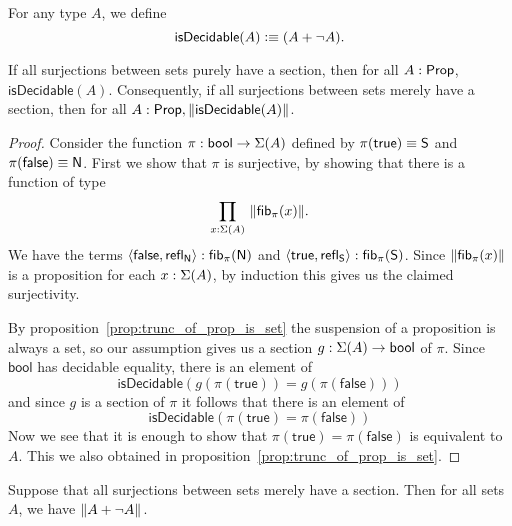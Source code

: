 \begin{defn}
For any  type  $A$, we define
\begin{equation*}
\mathsf{isDecidable}(A)\vcentcolon\equiv  (A+\neg A).
\end{equation*}
\end{defn}

\begin{thm}\label{thm:1surj_to_surj_to_pem}
If all surjections between sets purely have a section, then for all $A:\mathsf{Prop}$,
$\mathsf{isDecidable}(A)$. Consequently, if all surjections between sets merely have a section, then for all $A:\mathsf{Prop},
\left\Vert \mathsf{isDecidable}(A)\right\Vert_{}$.
\end{thm}

\begin{proof}
Consider the function $\pi:\mathsf{bool}\to\Sigma(A)$ defined by 
$\pi(\mathsf{true})\equiv \mathsf{S}$ and $\pi(\mathsf{false})\equiv \mathsf{N}$. 
First  we  show that $\pi$ is surjective, 
by showing that there is a function of type
\begin{equation*}
\prd{x:\susp(A)} \|\hfiber\pi{x}\|.
\end{equation*}
We have the terms 
$\langle{\mathsf{false},\ensuremath{\mathsf{refl}_{\mathsf{N}}}}\rangle:{\mathsf{fib}}_{\pi}(\mathsf{N})$ 
and $\langle{\mathsf{true},\ensuremath{\mathsf{refl}_{\mathsf{S}}}}\rangle:{\mathsf{fib}}_{\pi}(\mathsf{S})$. 
Since $\|{\mathsf{fib}}_{\pi}(x)\|$ is a proposition for each 
$x:\Sigma(A)$, by induction this gives us the claimed surjectivity.

By proposition~\ref{prop:trunc_of_prop_is_set} the suspension of 
a proposition is always a set, so our assumption gives us a 
section $g:\Sigma(A)\to\mathsf{bool}$ of $\pi$. 
Since $\mathsf{bool}$ has decidable equality, there is an element of
\begin{equation*}
\mathsf{isDecidable}(g(\pi(\mathsf{true}))= g(\pi(\mathsf{false})))
\end{equation*}
and since $g$ is a section of $\pi$ it follows that there is an element of
\begin{equation*}
\mathsf{isDecidable}(\pi(\mathsf{true})=\pi(\mathsf{false}))
\end{equation*}
Now we see that it is enough to show that 
$\pi(\mathsf{true})= \pi(\mathsf{false})$ is equivalent to $A$. 
This we also obtained in proposition~\ref{prop:trunc_of_prop_is_set}.
\end{proof}

\begin{cor}\label{cor:ACtoLEM0}
Suppose that all surjections between sets merely have a section. Then for all sets $A$, we have $\left\Vert A + \neg A\right\Vert_{}$.
\end{cor}

